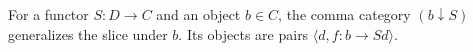 For a functor $S: D \to C$ and an object $b \in C$, the comma category $(b \downarrow S)$ generalizes the slice under $b$. Its objects are pairs $\langle d, f: b \to Sd \rangle$.

